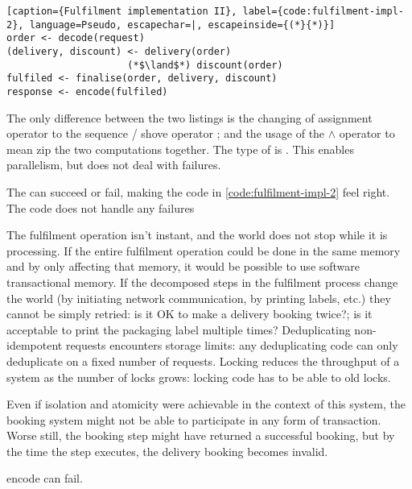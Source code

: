 \begin{lstlisting}[caption={Fulfilment implementation II}, label={code:fulfilment-impl-2}, language=Pseudo, escapechar=|, escapeinside={(*}{*)}]
order <- decode(request)
(delivery, discount) <- delivery(order) 
                     (*$\land$*) discount(order)
fulfiled <- finalise(order, delivery, discount)
response <- encode(fulfiled)
\end{lstlisting}

The only difference between the two listings is the changing of assignment \pcode{=} operator to the sequence / shove operator \pcode{<-}; and the usage of the $\land$ operator to mean zip the two computations together. The type of  is . This enables parallelism, but does not deal with failures.


The  can succeed or fail, making the code in \autoref{code:fulfilment-impl-2} feel right. The code does not handle any failures

The fulfilment operation isn't instant, and the world does not stop while it is processing. If the entire fulfilment operation could be done in the same memory and by only affecting that memory, it would be possible to use software transactional memory\cite{stm}. If the decomposed steps in the fulfilment process change the world (by initiating network communication, by printing labels, etc.) they cannot be simply retried: is it OK to make a delivery booking twice?; is it acceptable to print the packaging label multiple times? Deduplicating non-idempotent requests encounters storage limits: any deduplicating code can only deduplicate on a fixed number of requests. Locking reduces the throughput of a system as the number of locks grows: locking code has to be able to old locks. 

Even if isolation and atomicity were achievable in the context of this system, the  booking system might not be able to participate in any form of transaction. Worse still, the  booking step might have returned a successful booking, but by the time the  step executes, the delivery booking becomes invalid.

encode can fail.


